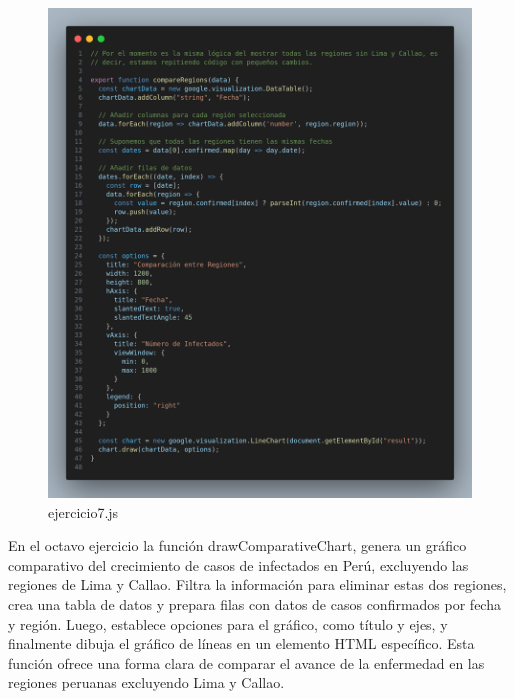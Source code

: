 \begin{figure}[H]
  \centering
  \includegraphics[width=1.0\textwidth]{img/7_js.png}
  \caption{ejercicio7.js}
\end{figure}
En el octavo ejercicio la función drawComparativeChart, genera un gráfico comparativo del crecimiento de casos de infectados en Perú, excluyendo las regiones de Lima y Callao. Filtra la información para eliminar estas dos regiones, crea una tabla de datos y prepara filas con datos de casos confirmados por fecha y región. Luego, establece opciones para el gráfico, como título y ejes, y finalmente dibuja el gráfico de líneas en un elemento HTML específico. Esta función ofrece una forma clara de comparar el avance de la enfermedad en las regiones peruanas excluyendo Lima y Callao.
